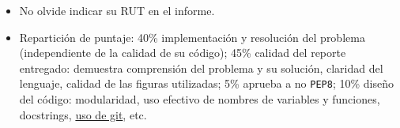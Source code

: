 \documentclass[letter, 11pt]{article}
\begin{document}
\begin{itemize}
  \item No olvide indicar su RUT en el informe.

  \item Repartición de puntaje: 40\% implementación y resolución del problema
    (independiente de la calidad de su código); 45\% calidad del reporte
    entregado: demuestra comprensión del problema y su solución, claridad del
    lenguaje, calidad de las figuras utilizadas; 5\% aprueba a no
    \texttt{PEP8}; 10\% diseño del código: modularidad, uso efectivo de nombres
    de variables y funciones, docstrings, \underline{uso de git}, etc.

\end{itemize}
\end{document}
